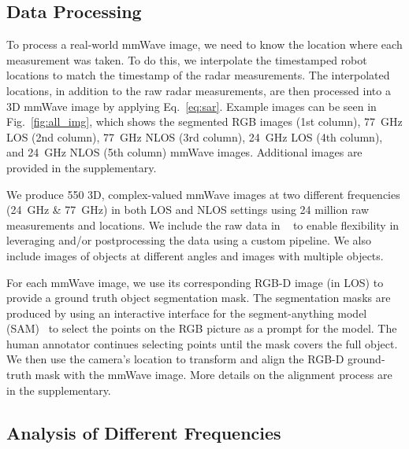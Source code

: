 \vspace{-0.1pt}
\subsection{Data Processing}
\vspace{-0.1pt}


To process a real-world mmWave image, we need to know the location where each measurement was taken. To do this, we interpolate the timestamped robot locations to match the timestamp of the radar measurements. The interpolated locations, in addition to the raw radar measurements, are then processed into a 3D mmWave image by applying Eq.~\ref{eq:sar}. Example images can be seen in Fig.~\ref{fig:all_img}, which shows the segmented RGB images (1st column), 77~GHz LOS (2nd column), 77~GHz NLOS (3rd column), 24~GHz LOS (4th column), and 24~GHz NLOS (5th column) mmWave images. Additional images are provided in the supplementary.



We produce 550 3D, complex-valued mmWave images at two different frequencies (24~GHz \& 77~GHz) in both LOS and NLOS settings using 24 million raw measurements and locations.  We include the raw data in \name~ to enable flexibility in leveraging and/or postprocessing the data using a custom pipeline. We also include images of objects at different angles and images with multiple objects.




For each mmWave image, we use its corresponding RGB-D image (in LOS) to provide a ground truth object segmentation mask. The segmentation masks are produced by using an interactive interface for the segment-anything model (SAM)~\cite{sam} to select the points on the RGB picture as a prompt for the model. The human annotator continues selecting points until the mask covers the full object. We then use the camera's location to transform and align the RGB-D ground-truth mask with the mmWave image. More details on the alignment process are in the supplementary.



\vspace{-0.1pt}
\subsection{Analysis of Different Frequencies}
\vspace{-0.1pt}

